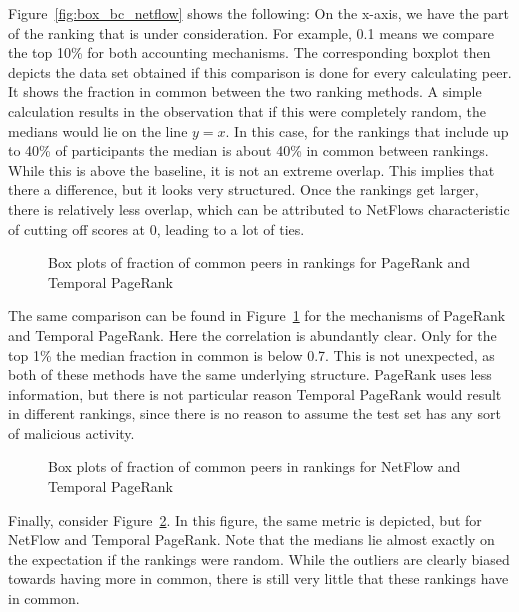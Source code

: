 \documentclass[a4paper,11pt]{book}
\theoremstyle{definition}
\begin{document}
Figure~\ref{fig:box_bc_netflow} shows the following: On the x-axis, we have the part
of the ranking that is under consideration. For example, 0.1 means we compare the
top 10\% for both accounting mechanisms. The corresponding boxplot then depicts
the data set obtained if this comparison is done for every calculating peer. It shows
the fraction in common between the two ranking methods. A simple calculation results
in the observation that if this were completely random, the medians would lie on
the line $y=x$. In this case, for the rankings that include up to 40\% of participants
the median is about 40\% in common between rankings. While this is above the baseline,
it is not an extreme overlap. This implies that there a difference, but it looks very
structured. Once the rankings get larger, there is relatively less overlap, which
can be attributed to NetFlows characteristic of cutting off scores at 0, leading
to a lot of ties.


\begin{figure}[ht]
    \centering
    
    \caption{Box plots of fraction of common peers in rankings for PageRank and Temporal PageRank}
    \label{fig:box_pr_tpr}
\end{figure}

The same comparison can be found in Figure~\ref{fig:box_pr_tpr} for the mechanisms of PageRank
and Temporal PageRank. Here the correlation is abundantly clear. Only for the top 1\% the
median fraction in common is below 0.7. This is not unexpected, as both of these methods
have the same underlying structure. PageRank uses less information, but there is not particular
reason Temporal PageRank would result in different rankings, since there is no reason to
assume the test set has any sort of malicious activity.

\begin{figure}[ht]
    \centering
    
    \caption{Box plots of fraction of common peers in rankings for NetFlow and Temporal PageRank}
    \label{fig:box_netflow_tpr}
\end{figure}

Finally, consider Figure~\ref{fig:box_netflow_tpr}. In this figure, the same metric is depicted, but
for NetFlow and Temporal PageRank. Note that the medians lie almost exactly on the expectation
if the rankings were random. While the outliers are clearly biased towards having more in common,
there is still very little that these rankings have in common.
\end{document}
